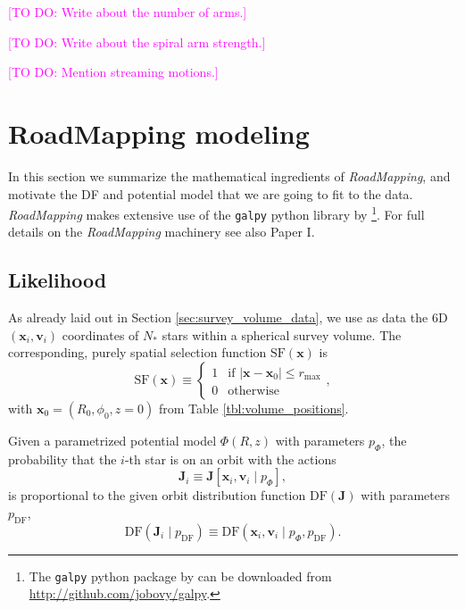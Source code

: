 \documentclass[iop,revtex4,numberedappendix,appendixfloats]{emulateapj}
\newcommand{\vect}[1]{\boldsymbol{#1}}
\newcommand{\RM}{{\sl RoadMapping}}
\newcommand{\Wilma}[1]{\textcolor{Magenta}{#1}}
\begin{document}
\Wilma{[TO DO: Write about the number of arms.]}

\Wilma{[TO DO: Write about the spiral arm strength.]}

\Wilma{[TO DO: Mention streaming motions.]}


\section{RoadMapping modeling} \label{sec:RoadMapping}

In this section we summarize the mathematical ingredients of \RM{}, and motivate the DF and potential model that we are going to fit to the data. \RM{} makes extensive use of the \texttt{galpy} python library by \citet{2015ApJS..216...29B}\footnote{The \texttt{galpy} python package by \citet{2015ApJS..216...29B} can be downloaded from \url{http://github.com/jobovy/galpy}.}. For full details on the \RM{} machinery see also Paper I.

\subsection{Likelihood} \label{sec:likelihood}

As already laid out in Section \ref{sec:survey_volume_data}, we use as data the 6D $(\vect{x}_i,\vect{v}_i)$ coordinates of $N_*$ stars within a spherical survey volume. The corresponding, purely spatial selection function $\text{SF}(\vect{x})$ is
\begin{equation}
\text{SF}(\vect{x}) \equiv \begin{cases} 1 &\mbox{if } \left| \vect{x}-\vect{x}_0 \right| \leq r_\text{max} \\
0 & \mbox{otherwise} \end{cases},
\end{equation}
with $\vect{x}_0 = (R_0,\phi_0,z=0)$ from Table \ref{tbl:volume_positions}.

Given a parametrized potential model $\Phi(R,z)$ with parameters $p_\Phi$, the probability that the $i$-th star is on an orbit with the actions 
\begin{equation}
\vect{J}_i \equiv \vect{J}[\vect{x}_i,\vect{v}_i \mid p_\Phi],
\end{equation}
is proportional to the given orbit distribution function $\text{DF}(\vect{J})$ with parameters $p_\text{DF}$,
\begin{equation}
\text{DF}(\vect{J}_i \mid p_\text{DF}) \equiv \text{DF}(\vect{x}_i,\vect{v}_i \mid p_\Phi,p_\text{DF}).
\end{equation}
\end{document}
